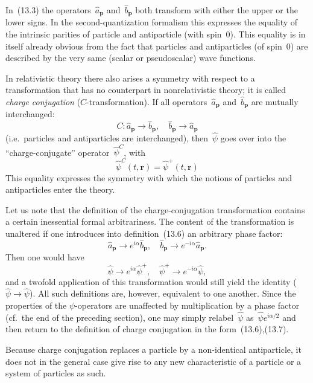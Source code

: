 In~(13.3) the operators~$\hat{a}_\mathbf{p}$ and~$\hat{b}_\mathbf{p}$ both transform with either the upper or the lower signs. In the second-quantization formalism this expresses the equality of the intrinsic parities of particle and antiparticle (with spin~0). This equality is in itself already obvious from the fact that particles and antiparticles (of spin~0) are described by the very same (scalar or pseudoscalar) wave functions.

In relativistic theory there also arises a symmetry with respect to a transformation that has no counterpart in nonrelativistic theory; it is called \emph{charge conjugation} ($C$-transformation). If all operators~$\hat{a}_\mathbf{p}$ and~$\hat{b}_\mathbf{p}$ are mutually interchanged:
\begin{equation}
C:\hat{a}_\mathbf{p} \to \hat{b}_\mathbf{p}, \quad \hat{b}_\mathbf{p} \to \hat{a}_\mathbf{p}
\tag{13.6}
\end{equation}
(i.e.\ particles and antiparticles are interchanged), then~$\hat{\psi}$ goes over into the ``charge-conjugate'' operator~$\hat{\psi}^C$, with
\begin{equation}
\hat{\psi}^C(t,\mathbf{r}) = \hat{\psi}^+(t,\mathbf{r})
\tag{13.7}
\end{equation}
This equality expresses the symmetry with which the notions of particles and antiparticles enter the theory.

Let us note that the definition of the charge-conjugation transformation contains a certain inessential formal arbitrariness. The content of the transformation is unaltered if one introduces into definition~(13.6) an arbitrary phase factor:
\[
\hat{a}_\mathbf{p} \to e^{i\alpha}\hat{b}_\mathbf{p}, \quad \hat{b}_\mathbf{p} \to e^{-i\alpha}\hat{a}_\mathbf{p}.
\]
Then one would have
\[
\hat{\psi} \to e^{i\alpha}\hat{\psi}^+, \quad \hat{\psi}^+ \to e^{-i\alpha}\hat{\psi},
\]
and a twofold application of this transformation would still yield the identity ($\hat{\psi} \to \hat{\psi}$). All such definitions are, however, equivalent to one another. Since the properties of the $\psi$-operators are unaffected by multiplication by a phase factor (cf.\ the end of the preceding section), one may simply relabel~$\hat{\psi}$ as~$\hat{\psi}e^{i\alpha/2}$ and then return to the definition of charge conjugation in the form~(13.6),(13.7).

Because charge conjugation replaces a particle by a non-identical antiparticle, it does not in the general case give rise to any new characteristic of a particle or a system of particles as such.

